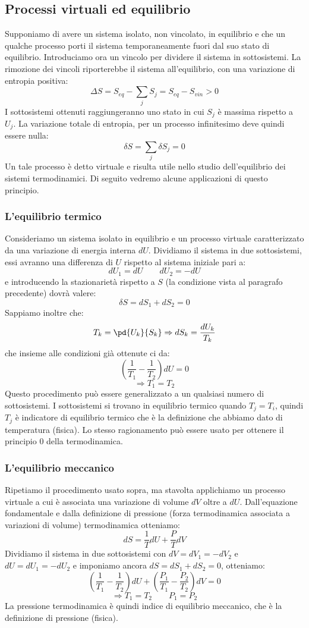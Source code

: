 \documentclass{article}
\begin{document}
\subsection{Processi virtuali ed equilibrio}
Supponiamo di avere un sistema isolato, non vincolato, in equilibrio e che un qualche processo porti il sistema temporaneamente fuori dal suo stato di equilibrio. Introduciamo ora un vincolo per dividere il sistema in sottosistemi. La rimozione dei vincoli riporterebbe il sistema all'equilibrio, con una variazione di entropia positiva:
$$ \Delta S = S_{eq} - \sum_j S_j = S_{eq} - S_{vin} > 0 $$
I sottosistemi ottenuti raggiungeranno uno stato in cui $S_j$ è massima rispetto a $U_j$. La variazione totale di entropia, per un processo infinitesimo deve quindi essere nulla:
$$ \delta S = \sum_j \delta S_j = 0$$
Un tale processo è detto virtuale e risulta utile nello studio dell'equilibrio dei sistemi termodinamici. Di seguito vedremo alcune applicazioni di questo principio.

\subsubsection{L'equilibrio termico}
Consideriamo un sistema isolato in equilibrio e un processo virtuale caratterizzato da una variazione di energia interna $dU$. Dividiamo il sistema in due sottosistemi, essi avranno una differenza di $U$ rispetto al sistema iniziale pari a:
$$ dU_1 = dU \qquad dU_2 = - dU $$
e introducendo la stazionarietà rispetto a $S$ (la condizione vista al paragrafo precedente) dovrà valere:
$$ \delta S = dS_1 + dS_2 = 0 $$
Sappiamo inoltre che:
$$ T_k = \pd{U_k}{S_k} \Rightarrow dS_k = \frac{dU_k}{T_k} $$
che insieme alle condizioni già ottenute ci da:
$$ \left( \frac{1}{T_1} - \frac{1}{T_2} \right)dU = 0 $$
$$ \Rightarrow T_1 = T_2 $$
Questo procedimento può essere generalizzato a un qualsiasi numero di sottosistemi. I sottosistemi si trovano in equilibrio termico quando $T_j=T_i$, quindi $T_j$ è indicatore di equilibrio termico che è la definizione che abbiamo dato di temperatura (fisica). Lo stesso ragionamento può essere usato per ottenere il principio 0 della termodinamica.

\subsubsection{L'equilibrio meccanico}
Ripetiamo il procedimento usato sopra, ma stavolta applichiamo un processo virtuale a cui è associata una variazione di volume $dV$ oltre a $dU$. Dall'equazione fondamentale e dalla definizione di pressione (forza termodinamica associata a variazioni di volume) termodinamica otteniamo:
$$ dS = \frac{1}{T}dU +\frac{P}{T}dV $$
Dividiamo il sistema in due sottosistemi con $dV=dV_1=-dV_2$ e $dU=dU_1=-dU_2$ e imponiamo ancora $dS=dS_1+dS_2=0$, otteniamo:
$$ \left( \frac{1}{T_1} - \frac{1}{T_2} \right)dU + \left( \frac{P_1}{T_1} - \frac{P_2}{T_2} \right)dV = 0 $$
$$ \Rightarrow T_1=T_2 \qquad P_1 = P_2 $$
La pressione termodinamica è quindi indice di equilibrio meccanico, che è la definizione di pressione (fisica).
\end{document}
